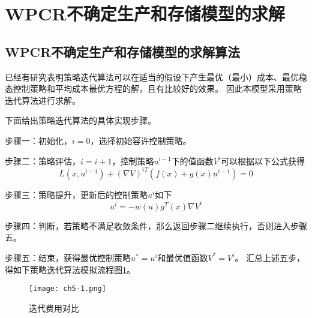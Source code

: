 \section{WPCR不确定生产和存储模型的求解}

\subsection{WPCR不确定生产和存储模型的求解算法}

已经有研究表明策略迭代算法可以在适当的假设下产生最优（最小）成本、最优稳态控制策略和平均成本最优方程的解，且有比较好的效果。
因此本模型采用策略迭代算法进行求解。

下面给出策略迭代算法的具体实现步骤。

步骤一：初始化，$i=0$，选择初始容许控制策略。

步骤二：策略评估，$i=i+1$，控制策略$u^{i-1}$下的值函数$V^i$可以根据以下公式获得
\begin{equation}
    L(x,u^{i-1}) + (\nabla V)^{iT}(f(x)+g(x)u^{i-1})=0
\end{equation}

步骤三：策略提升，更新后的控制策略$u^i$如下
\begin{equation}
    u^i=-w(u)g^T(x)\nabla V^i
\end{equation}

步骤四：判断，若策略不满足收敛条件，那么返回步骤二继续执行，否则进入步骤五。

步骤五：结束，获得最优控制策略$u^*=u^i$和最优值函数$V^*=V^i$。
汇总上述五步，得如下策略迭代算法模拟流程图\ref{f.ch5-1}\cite{叶帅2021基于事件触发自适应动态规划的多四旋翼无人机优化控制}。

\begin{figure}[h]
    \centering
    \texttt{[image: ch5-1.png]}
    \caption{迭代费用对比}
    \label{f.ch5-1}
\end{figure}

